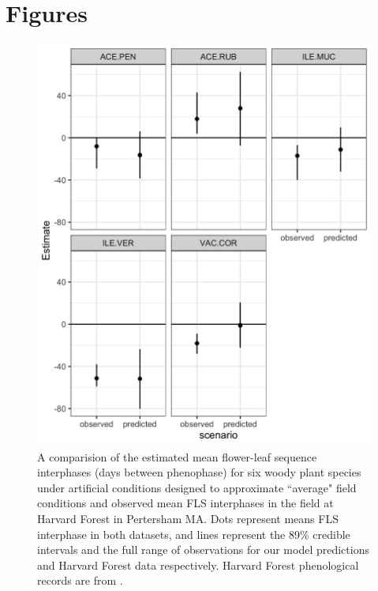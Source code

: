 \documentclass{article}\usepackage[]{graphicx}\usepackage[]{color}
\begin{document}
\pagebreak[4]

\section*{Figures}

 \begin{figure}[!ht]
    \centering
 \includegraphics[width=\textwidth]{..//Plots/fieldmodcomparisions.jpeg}
    \caption{A comparision of the estimated mean flower-leaf sequence interphases (days between phenophase) for six woody plant species under artificial conditions designed to approximate ``average" field conditions and observed mean FLS interphases in the field at Harvard Forest in Pertersham MA. Dots represent means FLS interphase in both datasets, and lines represent the 89\% credible intervals and the full range of observations for our model predictions and Harvard Forest data respectively.  Harvard Forest phenological records are from \citet{Okeefe2015}.}
    \label{fig:validate}
\end{figure}
\end{document}
